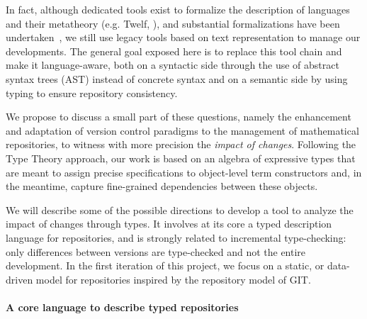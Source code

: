 \documentclass{article}
\newcommand{\remplan}[1]{\noindent\textcolor{bwblue}{$\triangleright$ \textbf{#1}}}
\newcommand{\remtext}[1]{\textcolor{bwgreen}{$\triangleright$ \textsl{#1}}}
\renewcommand{\remplan}[1]{}
\renewcommand{\remtext}[1]{}
\begin{document}
In fact, although dedicated tools exist to formalize the description
of languages and their metatheory (e.g. \textsf{Twelf},
{\citep{pfenning1999system}}), and substantial formalizations have been
undertaken~\citep{lee07}, we still use legacy tools based on text
representation to manage our developments. The general goal exposed
here is to replace this tool chain and make it language-aware, both on
a syntactic side through the use of abstract syntax trees (AST) instead of
concrete syntax and on a semantic side by using typing to ensure 
repository consistency.



We propose to discuss a small part of these questions, namely the
enhancement and adaptation of version control paradigms to the
management of mathematical repositories, to witness with more
precision the \emph{impact of changes}. Following the Type Theory
approach, our work is based on an algebra of expressive types that are
meant to assign precise specifications to object-level term
constructors and, in the meantime, capture fine-grained
dependencies between these objects.


We will describe some of the possible directions to develop a tool to
analyze the impact of changes through types. It involves at its core a
typed description language for repositories, and is strongly related
to incremental type-checking: only differences between versions are
type-checked and not the entire development. In the first iteration of
this project, we focus on a static, or data-driven model for
repositories inspired by the repository model of \textsf{GIT}.

\paragraph{A core language to describe typed repositories}
\end{document}

